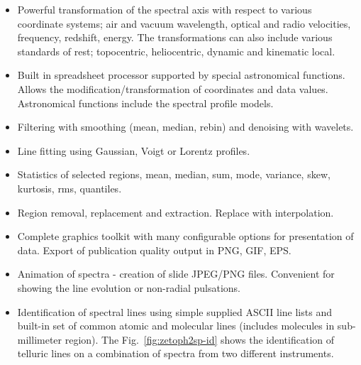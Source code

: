 \documentclass[final,authoryear,5p,times,twocolumn]{elsarticle}
\begin{document}
\begin{itemize}
\item Powerful transformation of the spectral axis with respect to various
  coordinate systems; air and vacuum wavelength, optical and radio velocities,
  frequency, redshift, energy. The transformations can also include various
  standards of rest; topocentric, heliocentric, dynamic and kinematic local.

\item Built in spreadsheet processor supported by special astronomical
  functions. Allows the modification/transformation of coordinates and data
  values. Astronomical functions include the spectral profile models.

\item Filtering with smoothing (mean, median, rebin) and denoising with wavelets.

\item Line fitting using Gaussian, Voigt or Lorentz profiles.

\item Statistics of selected regions, mean, median, sum, mode, variance, skew,
      kurtosis, rms, quantiles.

\item Region removal, replacement and extraction. Replace with interpolation.

\item Complete graphics toolkit with many configurable options for
  presentation of data. Export of publication quality output in PNG, GIF, EPS.

\item Animation of spectra - creation of slide JPEG/PNG files. Convenient
  for showing the line evolution or non-radial pulsations.

\item Identification of spectral lines using simple supplied ASCII line lists and
 built-in set of common  atomic and molecular lines (includes molecules in sub-millimeter
 region). The Fig.~\ref{fig:zetoph2sp-id} shows the identification of telluric lines on a
 combination of spectra from two different instruments. 


\end{itemize}
\end{document}
